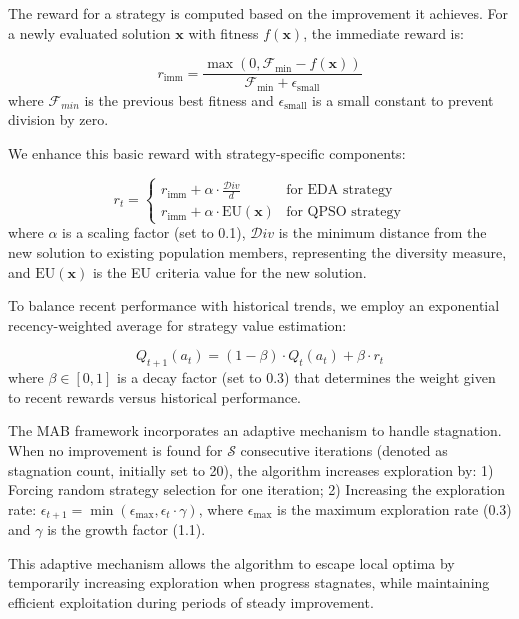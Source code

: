 \documentclass[review]{elsarticle}
\begin{document}
The reward for a strategy is computed based on the improvement it achieves. For a newly evaluated solution $\boldsymbol{x}$ with fitness $f(\boldsymbol{x})$, the immediate reward is:

\begin{equation}
r_{\text{imm}} = \frac{\max(0, \mathcal{F}_\text{min} - f(\boldsymbol{x}))}{\mathcal{F}_\text{min} + \epsilon_{\text{small}}}
\end{equation}
where $\mathcal{F}_{min}$ is the previous best fitness and $\epsilon_{\text{small}}$ is a small constant to prevent division by zero.

We enhance this basic reward with strategy-specific components:

\begin{equation}
r_t = 
\begin{cases}
r_{\text{imm}} + \alpha \cdot \frac{\mathcal{D}iv}{d} & \text{for EDA strategy} \\
r_{\text{imm}} + \alpha \cdot \text{EU}(\boldsymbol{x}) & \text{for QPSO strategy}
\end{cases}
\end{equation}
where $\alpha$ is a scaling factor (set to 0.1), $\mathcal{D}iv$ is the minimum distance from the new solution to existing population members, representing the diversity measure, and $\text{EU}(\boldsymbol{x})$ is the EU criteria value for the new solution.

To balance recent performance with historical trends, we employ an exponential recency-weighted average for strategy value estimation:

\begin{equation}
Q_{t+1}(a_t) = (1-\beta) \cdot Q_t(a_t) + \beta \cdot r_t
\end{equation}
where $\beta \in [0,1]$ is a decay factor (set to 0.3) that determines the weight given to recent rewards versus historical performance.

The MAB framework incorporates an adaptive mechanism to handle stagnation. When no improvement is found for $\mathcal{S}$ consecutive iterations (denoted as stagnation count, initially set to 20), the algorithm increases exploration by: 1) Forcing random strategy selection for one iteration; 2) Increasing the exploration rate: $\epsilon_{t+1} = \min(\epsilon_{\text{max}}, \epsilon_t \cdot \gamma)$, where $\epsilon_{\text{max}}$ is the maximum exploration rate (0.3) and $\gamma$ is the growth factor (1.1).

This adaptive mechanism allows the algorithm to escape local optima by temporarily increasing exploration when progress stagnates, while maintaining efficient exploitation during periods of steady improvement.
\end{document}
